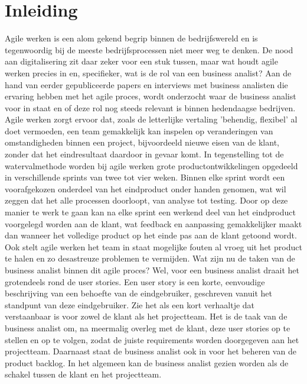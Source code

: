 \documentclass{hogent-article}
\affiliation{
	\textsuperscript{1} \href{mailto:bram.vanoverbeke@student.hogent.be}{bram.vanoverbeke@student.hogent.be}
	\textsuperscript{2}
	\href{mailto:stef.verlinde@student.hogent.be}{	stef.verlinde@student.hogent.be}
}
\affiliation{
	\textsuperscript{3}
	\href{mailto:jordy.detier@student.hogent.be}{jordy.detier@student.hogent.be}
	\textsuperscript{4} \href{mailto:joppe.minjauw@student.hogent.be}{joppe.minjauw@student.hogent.be}
}
\begin{document}
\flushbottom %
\maketitle %
\tableofcontents %
\thispagestyle{empty} %


\section{Inleiding}


Agile werken is een alom gekend begrip binnen de bedrijfswereld en is tegenwoordig bij de meeste bedrijfsprocessen niet meer weg te denken. De nood aan digitalisering zit daar zeker voor een stuk tussen, maar wat houdt agile werken precies in en, specifieker, wat is de rol van een business analist?
Aan de hand van eerder gepubliceerde papers en interviews met business analisten die ervaring hebben met het agile proces, wordt onderzocht waar de business analist voor in staat en of deze rol nog steeds relevant is binnen hedendaagse bedrijven.
\newline
\newline Agile werken zorgt ervoor dat, zoals de letterlijke vertaling 'behendig, flexibel' al doet vermoeden, een team gemakkelijk kan inspelen op veranderingen van omstandigheden binnen een project, bijvoordeeld nieuwe eisen van de klant, zonder dat het eindresultaat daardoor in gevaar komt. In tegenstelling tot de watervalmethode worden bij agile werken grote productontwikkelingen opgedeeld in verschillende sprints van twee tot vier weken. Binnen elke sprint wordt een voorafgekozen onderdeel van het eindproduct onder handen genomen, wat wil zeggen dat het alle processen doorloopt, van analyse tot testing. Door op deze manier te werk te gaan kan na elke sprint een werkend deel van het eindproduct voorgelegd worden aan de klant, wat feedback en aanpassing gemakkelijker maakt dan wanneer het volledige product op het einde pas aan de klant getoond wordt. Ook stelt agile werken het team in staat mogelijke fouten al vroeg uit het product te halen en zo desastreuze problemen te vermijden.\newline
\newline Wat zijn nu de taken van de business analist binnen dit agile proces? Wel, voor een business analist draait het grotendeels rond de user stories. Een user story is een korte, eenvoudige beschrijving van een behoefte van de eindgebruiker, geschreven vanuit het standpunt van deze eindgebruiker. Zie het als een kort verhaaltje dat verstaanbaar is voor zowel de klant als het projectteam. Het is de taak van de business analist om, na meermalig overleg met de klant, deze user stories op te stellen en op te volgen, zodat de juiste requirements worden doorgegeven aan het projectteam. Daarnaast staat de business analist ook in voor het beheren van de product backlog. In het algemeen kan de business analist gezien worden als de schakel tussen de klant en het projectteam.
\end{document}
